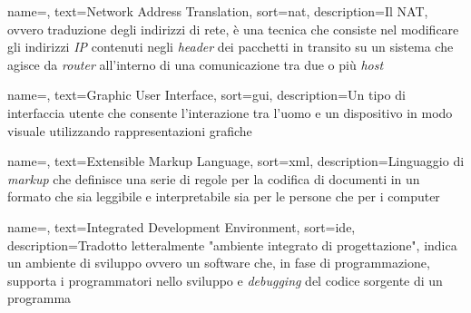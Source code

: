 {
	name=,
	text=Network Address Translation,
	sort=nat,
	description={Il NAT, ovvero traduzione degli indirizzi di rete, è una tecnica che consiste nel modificare gli indirizzi \textit{IP} contenuti negli \textit{header} dei pacchetti in transito su un sistema che agisce da \textit{router} all'interno di una comunicazione tra due o più \textit{host}}
}


{
	name=,
	text=Graphic User Interface,
	sort=gui,
	description={Un tipo di interfaccia utente che consente l'interazione tra l'uomo e un dispositivo in modo visuale utilizzando rappresentazioni grafiche}
}



{
	name=,
	text=Extensible Markup Language,
	sort=xml,
	description={Linguaggio di \textit{markup} che definisce una serie di regole per la codifica di documenti in un formato che sia leggibile e interpretabile sia per le persone che per i computer}
}

{
	name=,
	text=Integrated Development Environment,
	sort=ide,
	description={Tradotto letteralmente "ambiente integrato di progettazione", indica un ambiente di sviluppo ovvero un software che, in fase di programmazione, supporta i programmatori nello sviluppo e \textit{debugging} del codice sorgente di un programma}
}




